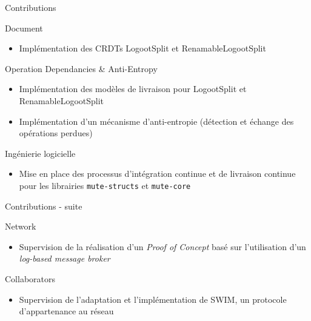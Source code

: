 \begin{frame}{Contributions}
    \begin{block}{Document}
        \begin{itemize}
            \item Implémentation des CRDTs LogootSplit et RenamableLogootSplit
        \end{itemize}
    \end{block}

    \begin{block}{Operation Dependancies \& Anti-Entropy}
        \begin{itemize}
            \item Implémentation des modèles de livraison pour LogootSplit et RenamableLogootSplit
            \item Implémentation d'un mécanisme d'anti-entropie (détection et échange des opérations perdues)
        \end{itemize}
    \end{block}

    \begin{block}{Ingénierie logicielle}
        \begin{itemize}
            \item Mise en place des processus d'intégration continue et de livraison continue pour les librairies \texttt{mute-structs} et \texttt{mute-core}
        \end{itemize}
    \end{block}
\end{frame}

\begin{frame}{Contributions - suite}
    \begin{block}{Network}
        \begin{itemize}
            \item Supervision de la réalisation d'un \emph{Proof of Concept} basé sur l'utilisation d'un \emph{log-based message broker}
        \end{itemize}
    \end{block}

    \begin{block}{Collaborators}
        \begin{itemize}
            \item Supervision de l'adaptation et l'implémentation de SWIM, un protocole d'appartenance au réseau
        \end{itemize}
    \end{block}
\end{frame}
